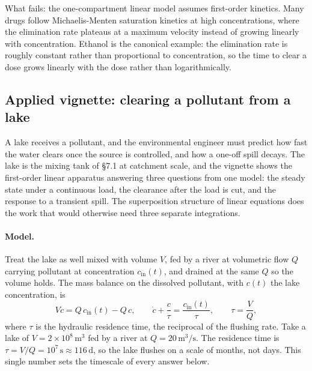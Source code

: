 What fails: the one-compartment linear model assumes
first-order kinetics. Many drugs follow Michaelis-Menten
saturation kinetics at high concentrations, where the elimination
rate plateaus at a maximum velocity instead of growing linearly
with concentration. Ethanol is the canonical example: the
elimination rate is roughly constant rather than proportional to
concentration, so the time to clear a dose grows linearly with the
dose rather than logarithmically.

\subsection{Applied vignette: clearing a pollutant from a lake}

A lake receives a pollutant, and the environmental engineer must predict
how fast the water clears once the source is controlled, and how a
one-off spill decays. The lake is the mixing tank of \S7.1 at
catchment scale, and the vignette shows the first-order linear apparatus
answering three questions from one model: the steady state under a
continuous load, the clearance after the load is cut, and the response
to a transient spill. The superposition structure of linear equations
does the work that would otherwise need three separate integrations.

\paragraph{Model.} Treat the lake as well mixed with volume $V$, fed by
a river at volumetric flow $Q$ carrying pollutant at concentration
$c_{\text{in}}(t)$, and drained at the same $Q$ so the volume holds. The
mass balance on the dissolved pollutant, with $c(t)$ the lake
concentration, is
\[
V\dot{c} = Q\, c_{\text{in}}(t) - Q\, c,
\qquad
\dot{c} + \frac{c}{\tau} = \frac{c_{\text{in}}(t)}{\tau},
\qquad \tau = \frac{V}{Q},
\]
where $\tau$ is the hydraulic residence time, the reciprocal of the
flushing rate. Take a lake of $V = 2\times 10^{8}\,\si{\meter\cubed}$
fed by a river at $Q = 20\,\si{\meter\cubed\per\second}$. The residence
time is $\tau = V/Q = 10^{7}\,\si{\second} \approx 116\,\si{\day}$, so
the lake flushes on a scale of months, not days. This single number sets
the timescale of every answer below.

